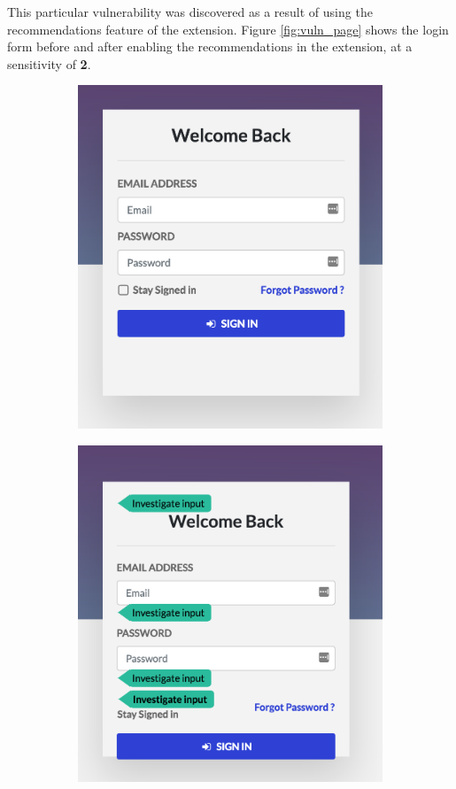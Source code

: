 This particular vulnerability was discovered as a result of using the recommendations feature of the extension. Figure \ref{fig:vuln_page} shows the login form before and after enabling the recommendations in the extension, at a sensitivity of \textbf{2}. \\

\begin{figure}[h]
	\centering
	\begin{subfigure}{.5\textwidth}
		\centering
		\includegraphics[width=.8\linewidth]{images/test_case_1/original_page_anon_cropped.png}
		\label{fig:original_page_anon}
	\end{subfigure}%
	\begin{subfigure}{.5\textwidth}
		\centering
		\includegraphics[width=.8\linewidth]{images/test_case_1/recommendations_anon_cropped.png}

\end{subfigure}
\end{figure}
